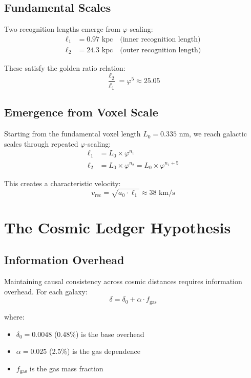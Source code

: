 \documentclass[12pt,a4paper]{article}
\begin{document}
\subsection{Fundamental Scales}

Two recognition lengths emerge from $\varphi$-scaling:
\begin{align}
\ell_1 &= 0.97 \text{ kpc} \quad \text{(inner recognition length)} \\
\ell_2 &= 24.3 \text{ kpc} \quad \text{(outer recognition length)}
\end{align}

These satisfy the golden ratio relation:
\begin{equation}
\frac{\ell_2}{\ell_1} = \varphi^5 \approx 25.05
\end{equation}

\subsection{Emergence from Voxel Scale}

Starting from the fundamental voxel length $L_0 = 0.335$ nm, we reach galactic scales through repeated $\varphi$-scaling:
\begin{align}
\ell_1 &= L_0 \times \varphi^{n_1} \\
\ell_2 &= L_0 \times \varphi^{n_2} = L_0 \times \varphi^{n_1+5}
\end{align}

This creates a characteristic velocity:
\begin{equation}
v_{\text{rec}} = \sqrt{a_0 \cdot \ell_1} \approx 38 \text{ km/s}
\end{equation}

\section{The Cosmic Ledger Hypothesis}

\subsection{Information Overhead}

Maintaining causal consistency across cosmic distances requires information overhead. For each galaxy:
\begin{equation}
\delta = \delta_0 + \alpha \cdot f_{\text{gas}}
\end{equation}

where:
\begin{itemize}
\item $\delta_0 = 0.0048$ (0.48\%) is the base overhead
\item $\alpha = 0.025$ (2.5\%) is the gas dependence
\item $f_{\text{gas}}$ is the gas mass fraction
\end{itemize}
\end{document}
